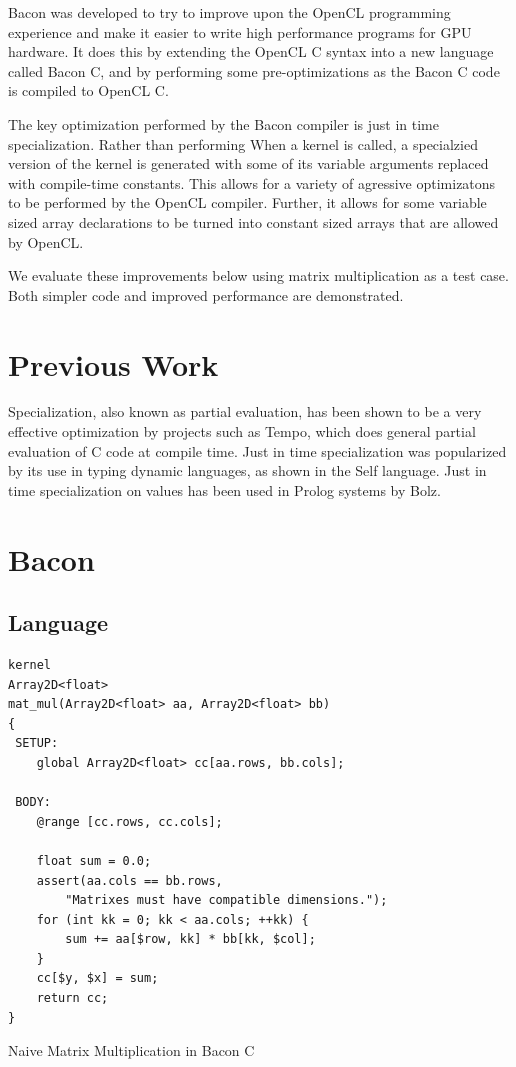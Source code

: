 \documentclass{llncs}
\begin{document}
Bacon was developed to try to improve upon the OpenCL programming
experience and make it easier to write high performance programs for
GPU hardware. It does this by extending the OpenCL C syntax into a new
language called Bacon C, and by performing some pre-optimizations as
the Bacon C code is compiled to OpenCL C.

The key optimization performed by the Bacon compiler is just in time
specialization. Rather than performing When a kernel is called, a
specialzied version of the kernel is generated with some of its
variable arguments replaced with compile-time constants. This allows
for a variety of agressive optimizatons to be performed by the OpenCL
compiler. Further, it allows for some variable sized array
declarations to be turned into constant sized arrays that are allowed
by OpenCL.

We evaluate these improvements below using matrix multiplication as a
test case. Both simpler code and improved performance are
demonstrated.

\section{Previous Work}

Specialization, also known as partial evaluation, has been shown to be
a very effective optimization by projects such as
Tempo\cite{consel:1998}, which does general partial evaluation of C
code at compile time. Just in time specialization was popularized by
its use in typing dynamic languages, as shown in the Self
language\cite{chambers:1992}. Just in time specialization on values has
been used in Prolog systems by Bolz\cite{bolz:2010}.

\section{Bacon}
\subsection{Language}

\begin{listing}[tb]
\begin{verbatim}
kernel
Array2D<float>
mat_mul(Array2D<float> aa, Array2D<float> bb) 
{
 SETUP:
    global Array2D<float> cc[aa.rows, bb.cols];

 BODY:
    @range [cc.rows, cc.cols];

    float sum = 0.0;
    assert(aa.cols == bb.rows, 
        "Matrixes must have compatible dimensions.");
    for (int kk = 0; kk < aa.cols; ++kk) {
        sum += aa[$row, kk] * bb[kk, $col];
    }
    cc[$y, $x] = sum;
    return cc;
}
\end{verbatim}
\caption{Naive Matrix Multiplication in Bacon C}\label{mmk}
\end{listing}
\end{document}
